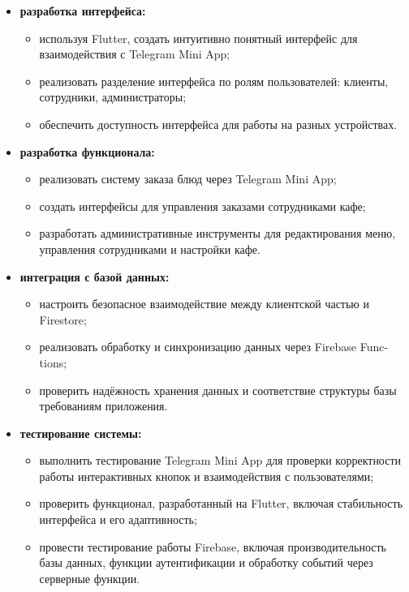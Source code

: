 {\begin{itemize}
        \item \textbf{разработка интерфейса:}
        \begin{itemize}
            \item используя Flutter, создать интуитивно понятный интерфейс для взаимодействия с Telegram Mini App;
            \item реализовать разделение интерфейса по ролям пользователей: клиенты, сотрудники, администраторы;
            \item обеспечить доступность интерфейса для работы на разных устройствах.
        \end{itemize}

        \item \textbf{разработка функционала:}
        \begin{itemize}
            \item реализовать систему заказа блюд через Telegram Mini App;
            \item создать интерфейсы для управления заказами сотрудниками кафе;
            \item разработать административные инструменты для редактирования меню, управления сотрудниками и настройки кафе.
        \end{itemize}

        \item \textbf{интеграция с базой данных:}
        \begin{itemize}
            \item настроить безопасное взаимодействие между клиентской частью и Firestore;
            \item реализовать обработку и синхронизацию данных через Firebase Func-tions;
            \item проверить надёжность хранения данных и соответствие структуры базы требованиям приложения.
        \end{itemize}

        \item \textbf{тестирование системы:}
        \begin{itemize}
            \item выполнить тестирование Telegram Mini App для проверки корректности работы интерактивных кнопок и взаимодействия с пользователями;
            \item проверить функционал, разработанный на Flutter, включая стабильность интерфейса и его адаптивность;
            \item провести тестирование работы Firebase, включая производительность базы данных, функции аутентификации и обработку событий через серверные функции.
        \end{itemize}


\end{itemize}}
